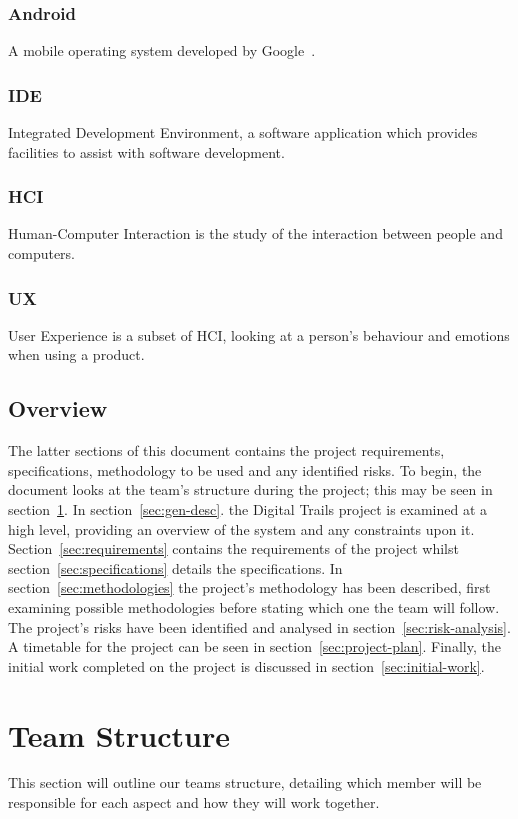 \documentclass[11pt,a4paper]{article}
\begin{document}
\subsubsection{Android}
A mobile operating system developed by Google~\cite{android}. 

\subsubsection{IDE}
Integrated Development Environment, a software application which provides facilities to assist with software development.

\subsubsection{HCI}
Human-Computer Interaction is the study of the interaction between people and computers.

\subsubsection{UX}
User Experience is a subset of HCI, looking at a person's behaviour and emotions when using a product.

\subsection{Overview}
The latter sections of this document contains the project requirements, specifications, methodology to be used and any identified risks. To begin, the document looks at the team's structure during the project; this may be seen in section~\ref{sec:team-structure}. In section~\ref{sec:gen-desc}. the Digital Trails project is examined at a high level, providing an overview of the system and any constraints upon it. Section~\ref{sec:requirements} contains the requirements of the project whilst section~\ref{sec:specifications} details the specifications. In section~\ref{sec:methodologies} the project's methodology has been described, first examining possible methodologies before stating which one the team will follow. The project's risks have been identified and analysed in section~\ref{sec:risk-analysis}. A timetable for the project can be seen in section~\ref{sec:project-plan}. Finally, the initial work completed on the project is discussed in section~\ref{sec:initial-work}.



\section{Team Structure}
\label{sec:team-structure}
This section will outline our teams structure, detailing which member will be responsible for each aspect and how they will work together. 
\end{document}
